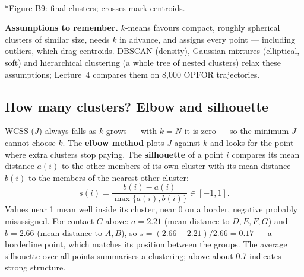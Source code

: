 \documentclass[11pt]{article}
\begin{document}
\begin{center}\\*{\small\color{GreyN}Figure B9: final clusters; crosses mark centroids.}\end{center}
\textbf{Assumptions to remember.} $k$-means favours compact, roughly spherical clusters of similar size, needs $k$ in advance, and assigns every point --- including outliers, which drag centroids. DBSCAN (density), Gaussian mixtures (elliptical, soft) and hierarchical clustering (a whole tree of nested clusters) relax these assumptions; Lecture~4 compares them on 8,000 OPFOR trajectories.

\subsection{How many clusters? Elbow and silhouette}
WCSS ($J$) always falls as $k$ grows --- with $k=N$ it is zero --- so the minimum $J$ cannot choose $k$. The \textbf{elbow method} plots $J$ against $k$ and looks for the point where extra clusters stop paying. The \textbf{silhouette} of a point $i$ compares its mean distance $a(i)$ to the other members of its own cluster with its mean distance $b(i)$ to the members of the nearest other cluster:
\[s(i)=\frac{b(i)-a(i)}{\max\{a(i),b(i)\}}\in[-1,1].\]
Values near 1 mean well inside its cluster, near 0 on a border, negative probably misassigned. For contact $C$ above: $a=2.21$ (mean distance to $D,E,F,G$) and $b=2.66$ (mean distance to $A,B$), so $s=(2.66-2.21)/2.66=0.17$ --- a borderline point, which matches its position between the groups. The average silhouette over all points summarises a clustering; above about 0.7 indicates strong structure.
\end{document}
